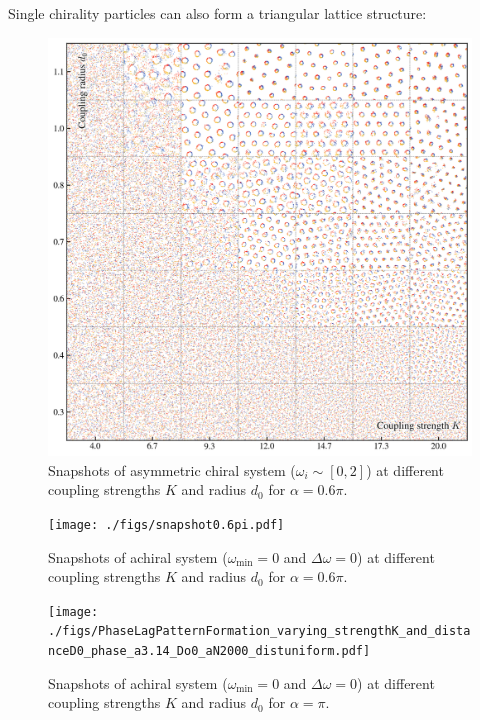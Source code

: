 \documentclass{article}
\begin{document}
Single chirality particles can also form a triangular lattice structure:
\begin{figure}[H]
    \centering
    \includegraphics[width=\textwidth]{./figs/asymmetric.png}
    \caption{
        Snapshots of asymmetric chiral system ($\omega _{i}\sim[0, 2]$) at different coupling strengths $K$ and radius $d_0$ for $\alpha = 0.6\pi$.
    }
\end{figure}

\begin{figure}[H]
    \centering
    \texttt{[image: ./figs/snapshot0.6pi.pdf]}
    \caption{
        Snapshots of achiral system ($\omega _{\min}=0$ and $\Delta \omega=0$) at different coupling strengths $K$ and radius $d_0$ for $\alpha = 0.6\pi$. 
    }
\end{figure}

\begin{figure}[H]
    \centering
    \texttt{[image: ./figs/PhaseLagPatternFormation\_varying\_strengthK\_and\_distanceD0\_phase\_a3.14\_Do0\_aN2000\_distuniform.pdf]}
    \caption{
        Snapshots of achiral system ($\omega _{\min}=0$ and $\Delta \omega=0$) at different coupling strengths $K$ and radius $d_0$ for $\alpha = \pi$. 
    }
\end{figure}
\end{document}
